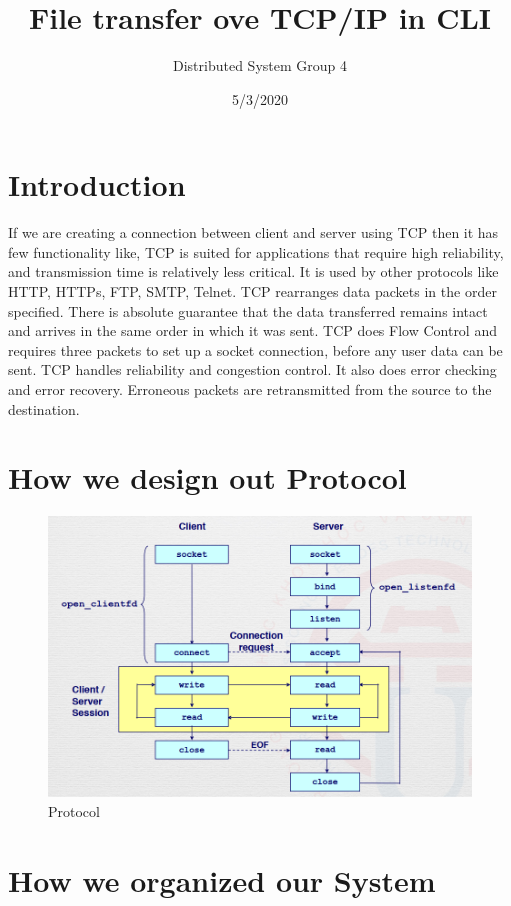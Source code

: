 \documentclass{article}
\title{File transfer ove TCP/IP in CLI}
\date{5/3/2020}
\author{Distributed System Group 4}
\begin{document}
\maketitle
{}
\newpage
\tableofcontents
\newpage
{}
\section{Introduction}
    If we are creating a connection between client and server using TCP then it has few functionality like, TCP is suited for applications that require high reliability, and transmission time is relatively less critical. It is used by other protocols like HTTP, HTTPs, FTP, SMTP, Telnet. TCP rearranges data packets in the order specified. There is absolute guarantee that the data transferred remains intact and arrives in the same order in which it was sent. TCP does Flow Control and requires three packets to set up a socket connection, before any user data can be sent. TCP handles reliability and congestion control. It also does error checking and error recovery. Erroneous packets are retransmitted from the source to the destination.

\section{How we design out Protocol}
    \begin{figure}[H]
    \includegraphics[width=\linewidth]{protocol.png}
    \caption{Protocol}
    \end{figure}


\section{How we organized our System}
\end{document}
